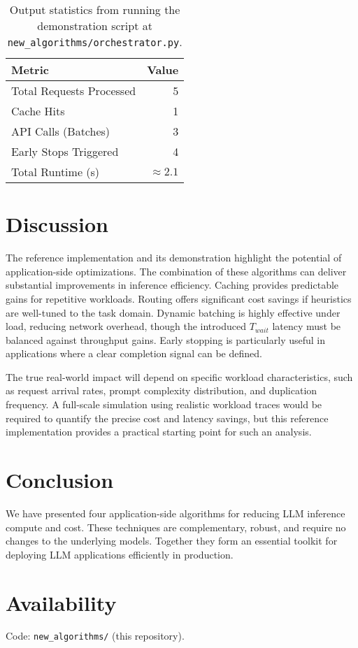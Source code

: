 \documentclass[11pt]{article}
\begin{document}
\begin{table}[h]
\centering
\begin{tabular}{lr}
\toprule
\textbf{Metric} & \textbf{Value} \\
\midrule
Total Requests Processed & 5 \\
Cache Hits & 1 \\
API Calls (Batches) & 3 \\
Early Stops Triggered & 4 \\
Total Runtime (s) & \(\approx 2.1\) \\
\bottomrule
\end{tabular}
\caption{Output statistics from running the demonstration script at \texttt{new\_algorithms/orchestrator.py}.}
\label{tab:results}
\end{table}

\section{Discussion}
The reference implementation and its demonstration highlight the potential of application-side optimizations. The combination of these algorithms can deliver substantial improvements in inference efficiency. Caching provides predictable gains for repetitive workloads. Routing offers significant cost savings if heuristics are well-tuned to the task domain. Dynamic batching is highly effective under load, reducing network overhead, though the introduced $T_{wait}$ latency must be balanced against throughput gains. Early stopping is particularly useful in applications where a clear completion signal can be defined.

The true real-world impact will depend on specific workload characteristics, such as request arrival rates, prompt complexity distribution, and duplication frequency. A full-scale simulation using realistic workload traces would be required to quantify the precise cost and latency savings, but this reference implementation provides a practical starting point for such an analysis.

\section{Conclusion}
We have presented four application-side algorithms for reducing LLM inference compute and cost. These techniques are complementary, robust, and require no changes to the underlying models. Together they form an essential toolkit for deploying LLM applications efficiently in production.

\section*{Availability}
Code: \texttt{new\_algorithms/} (this repository).



\end{document}
